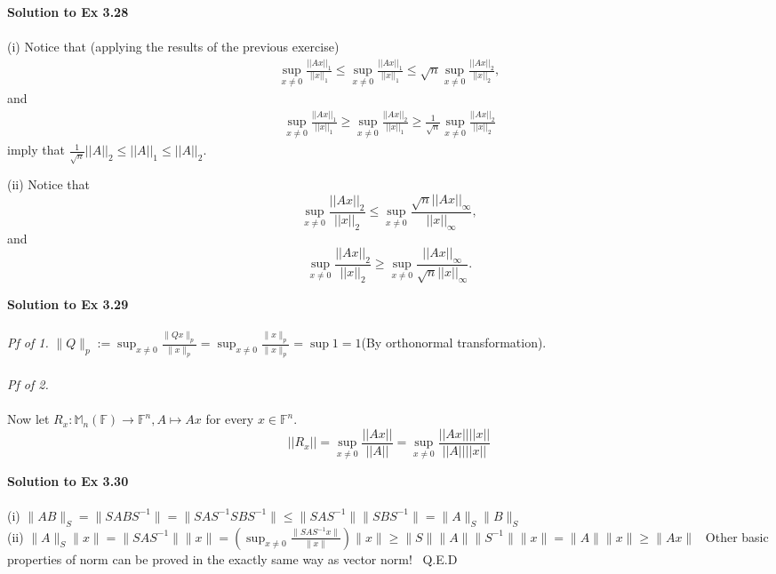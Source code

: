 \documentclass[letterpaper,12pt]{article}
\theoremstyle{definition}
\begin{document}
\begin{spacing}{1.3}{}
	\textbf{Solution to Ex 3.28} \\\\
	(i)
	Notice that (applying the results of the previous exercise)
	\begin{align*}
	\sup_{x\neq 0}\frac{||Ax||_1}{||x||_1}\leq
	\sup_{x\neq 0}\frac{||Ax||_1}{||x||_1}\leq
	\sqrt{n}\sup_{x\neq 0}\frac{||Ax||_2}{||x||_2},
	\end{align*}
	and
	\begin{align*}
	\sup_{x\neq 0}\frac{||Ax||_1}{||x||_1}\geq
	\sup_{x\neq 0}\frac{||Ax||_2}{||x||_1}\geq
	\frac{1}{\sqrt{n}}\sup_{x\neq 0}\frac{||Ax||_2}{||x||_2}
	\end{align*}
	imply that $\frac{1}{\sqrt{n}}||A||_2\leq||A||_1\leq||A||_2$.
	
	(ii)
	Notice that
	\begin{equation*}
	\sup_{x\neq 0}\frac{||Ax||_2}{||x||_2}\leq
	\sup_{x\neq 0}\frac{\sqrt{n}||Ax||_\infty}{||x||_\infty},
	\end{equation*}
	and
	\begin{equation*}
	\sup_{x\neq 0}\frac{||Ax||_2}{||x||_2}\geq
	\sup_{x\neq 0}\frac{||Ax||_\infty}{\sqrt{n}||x||_\infty}.
	\end{equation*}
	
	
	\textbf{Solution to Ex 3.29} \\\\
	\emph{Pf of 1.} $\|Q\|_p := \sup_{x \neq 0} \frac{\|Qx\|_p}{\|x\|_p} = \sup_{x \neq 0} \frac{\|x\|_p}{\|x\|_p} = \sup 1 = 1 $(By orthonormal transformation). \\\\
	\emph{Pf of 2.} \\\\
	Now let $R_x:\mathbb M_n(\mathbb F)\to\mathbb F^n, A\mapsto Ax$ for every $x\in\mathbb F^n$.
	\begin{equation*}
	||R_x||=\sup_{x\neq 0}\frac{||Ax||}{||A||}=
	\sup_{x\neq 0}\frac{||Ax||||x||}{||A||||x||}
	\end{equation*}
	
	\setlength{\leftskip}{10pt}
	
	\textbf{Solution to Ex 3.30} \\\\
	(i) $\|AB\|_S = \|SABS^{-1}\| = \|SAS^{-1} SBS^{-1}\| \leq \|SAS^{-1}\| \|SBS^{-1}\| = \|A\|_S \|B\|_S  $ \\
	(ii) $\|A\|_{S} \|x\| = \|SAS^{-1}\| \|x\| = (\sup_{x \neq 0} \frac{\|SAS^{-1} x\|}{\|x\|}) \|x\| \geq \|S\| \|A\| \|S^{-1}\| \|x\| = \|A\| \|x\| \geq \|Ax\| $ \ Other basic properties of norm can be proved in the exactly same way as vector norm! \ Q.E.D \\\\
	

\end{spacing}
\end{document}
